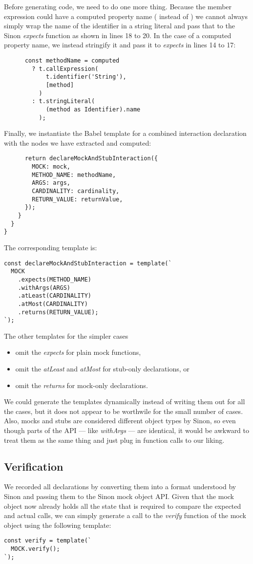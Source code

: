 Before generating code,
we need to do one more thing.
Because the member expression could have a computed property name
( instead of )
we cannot always simply wrap the name of the identifier
in a string literal and pass that
to the Sinon \textit{expects} function
as shown in lines 18 to 20.
In the case of a computed property name,
we instead stringify it and pass it to \textit{expects}
in lines 14 to 17:
\begin{verbatim}
      const methodName = computed
        ? t.callExpression(
            t.identifier('String'),
            [method]
          )
        : t.stringLiteral(
            (method as Identifier).name
          );
\end{verbatim}

Finally, we instantiate the Babel template
for a combined interaction declaration
with the nodes we have extracted and computed:
\begin{verbatim}
      return declareMockAndStubInteraction({
        MOCK: mock,
        METHOD_NAME: methodName,
        ARGS: args,
        CARDINALITY: cardinality,
        RETURN_VALUE: returnValue,
      });
    }
  }
}
\end{verbatim}

The corresponding template is:
\begin{verbatim}
const declareMockAndStubInteraction = template(`
  MOCK
    .expects(METHOD_NAME)
    .withArgs(ARGS)
    .atLeast(CARDINALITY)
    .atMost(CARDINALITY)
    .returns(RETURN_VALUE);
`);
\end{verbatim}
The other templates for the simpler cases
\begin{itemize}
  \item omit the \textit{expects} for plain mock functions,
  \item omit the \textit{atLeast} and \textit{atMost} for stub-only declarations, or
  \item omit the \textit{returns} for mock-only declarations.
\end{itemize}

We could generate the templates dynamically
instead of writing them out for all the cases,
but it does not appear to be worthwile for the small number of cases.
Also, mocks and stubs are considered different object types by Sinon,
so even though parts of the API --- like \textit{withArgs} --- are identical,
it would be awkward to treat them as the same thing
and just plug in function calls to our liking.

\subsection{Verification}
We recorded all declarations by
converting them into a format understood by Sinon
and passing them to the Sinon mock object API.
Given that the mock object now already holds all the state
that is required to compare the expected and actual calls,
we can simply generate a call to the \textit{verify} function
of the mock object using the following template:
\begin{verbatim}
const verify = template(`
  MOCK.verify();
`);
\end{verbatim}
